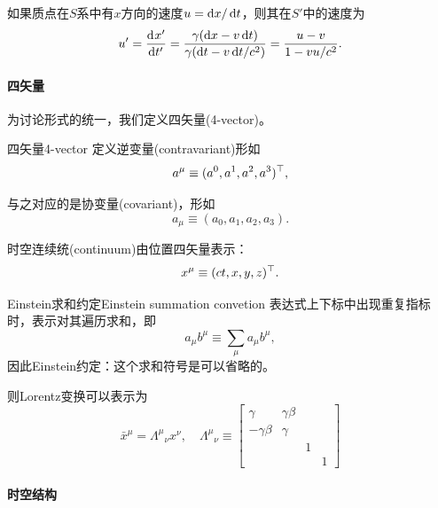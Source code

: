 如果质点在$S$系中有$x$方向的速度$u=\mathop{}\!\mathrm{d} x/\mathop{}\!\mathrm{d} t$，则其在$S'$中的速度为
\begin{equation}
    u'=\frac{\mathrm{d}^{{}}x'}{\mathrm{d}{t'}^{{}}}=\frac{\gamma(\mathop{}\!\mathrm{d} x-v\mathop{}\!\mathrm{d} t)}{\gamma(\mathop{}\!\mathrm{d} t-v\mathop{}\!\mathrm{d} t/c^2)}=\frac{u-v}{1-vu/c^2}.
\end{equation}

\paragraph{四矢量}

为讨论形式的统一，我们定义四矢量(4-vector)。

\begin{definition}{四矢量}{4-vector}
    定义逆变量(contravariant)形如
    \begin{equation}
        a^\mu\equiv(a^0,a^1,a^2,a^3)^\top,
    \end{equation}

    与之对应的是协变量(covariant)，形如
    \begin{equation}
        a_\mu\equiv(a_0,a_1,a_2,a_3).
    \end{equation}
\end{definition}
时空连续统(continuum)由位置四矢量表示：
\begin{equation}
    x^\mu\equiv(ct,x,y,z)^\top.
\end{equation}
\begin{definition}{Einstein求和约定}{Einstein summation convetion}
    表达式上下标中出现重复指标时，表示对其遍历求和，即
    \begin{equation}
        a_\mu b^\mu\equiv\sum_\mu a_\mu b^\mu,
    \end{equation}
    因此Einstein约定：这个求和符号是可以省略的。
\end{definition}
则Lorentz变换可以表示为
\[
    \bar x^\mu=\Lambda^\mu{}_\nu x^\nu,\quad\Lambda^\mu{}_\nu\equiv
    \begin{bmatrix}
		\gamma&\gamma\beta\\-\gamma\beta&\gamma\\ &&1\\ &&&1
	\end{bmatrix}
\]

\paragraph{时空结构}

